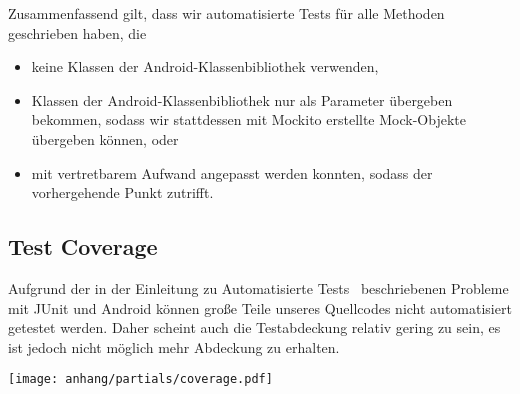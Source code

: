 Zusammenfassend gilt, dass wir automatisierte Tests für alle Methoden geschrieben haben,
die
\begin{itemize}
\item keine Klassen der Android-Klassenbibliothek verwenden,
\item Klassen der Android-Klassenbibliothek nur als Parameter übergeben bekommen,
sodass wir stattdessen mit Mockito erstellte Mock-Objekte übergeben können, oder
\item mit vertretbarem Aufwand angepasst werden konnten, sodass der vorhergehende Punkt zutrifft.
\end{itemize}











\subsection{Test Coverage}

Aufgrund der in der Einleitung zu \glqq Automatisierte Tests\grqq~ beschriebenen Probleme mit JUnit und Android können große Teile unseres Quellcodes nicht automatisiert getestet werden. Daher scheint auch die Testabdeckung relativ gering zu sein, es ist jedoch nicht möglich mehr Abdeckung zu erhalten.

\hspace{-1cm}
\texttt{[image: anhang/partials/coverage.pdf]}


